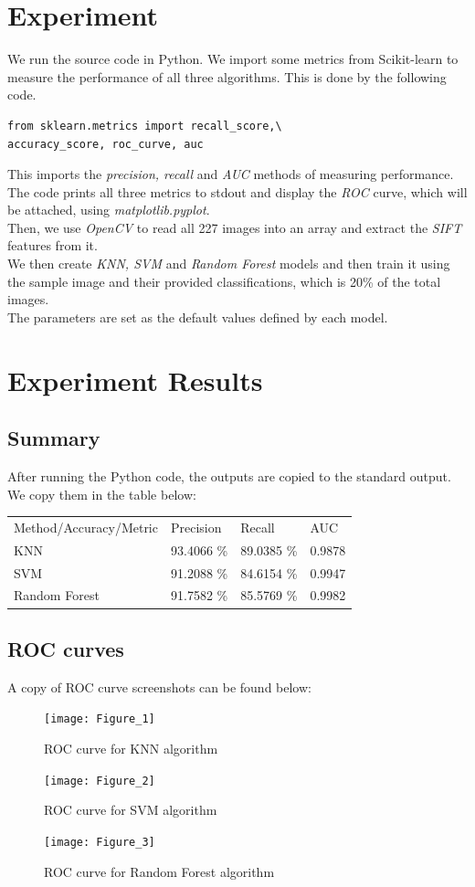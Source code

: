 \documentclass[9pt,technote]{IEEEtran}
\begin{document}
\section{Experiment}

We run the source code in Python. We import some metrics from Scikit-learn to measure the performance of all three algorithms. This is done by the following code.
\begin{verbatim}
from sklearn.metrics import recall_score,\
accuracy_score, roc_curve, auc
\end{verbatim}

This imports the \textit{precision, recall} and \textit{AUC} methods of measuring performance. The code prints all three metrics to stdout and display the \textit{ROC} curve, which will be attached, using \textit{matplotlib.pyplot}.\\
Then, we use \textit{OpenCV} to read all 227 images into an array and extract the \textit{SIFT} features from it.\cite{4590383}\\

We then create \textit{KNN, SVM} and \textit{Random Forest} models and then train it using the sample image and their provided classifications, which is 20\% of the total images.\\

The parameters are set as the default values defined by each model.
\section{Experiment Results}
\subsection{Summary}
After running the Python code, the outputs are copied to the standard output. We copy them in the table below:
\begin{table}[]
\begin{tabular}{llll}
Method/Accuracy/Metric & Precision  & Recall     & AUC    \\
KNN                    & 93.4066 \% & 89.0385 \% & 0.9878 \\
SVM                    & 91.2088 \% & 84.6154 \% & 0.9947 \\
Random Forest          & 91.7582 \% & 85.5769 \% & 0.9982
\end{tabular}
\end{table}
\subsection{ROC curves}
A copy of ROC curve screenshots can be found below:\\
\begin{figure}[h!]
  \centering
  \texttt{[image: Figure\_1]}
  \caption{ROC curve for KNN algorithm}
\end{figure}
\begin{figure}[h!]
  \centering
  \texttt{[image: Figure\_2]}
  \caption{ROC curve for SVM algorithm}
\end{figure}
\begin{figure}[h!]
  \centering
  \texttt{[image: Figure\_3]}
  \caption{ROC curve for Random Forest algorithm}
\end{figure}
\end{document}
